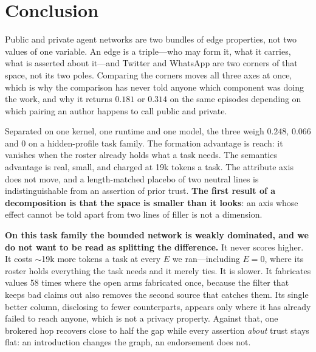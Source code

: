 \section{Conclusion}

Public and private agent networks are two bundles of edge properties, not two values of one
variable. An edge is a triple---who may form it, what it carries, what is asserted about
it---and Twitter and WhatsApp are two corners of that space, not its two poles. Comparing
the corners moves all three axes at once, which is why the comparison has never told anyone
which component was doing the work, and why it returns $0.181$ or $0.314$ on the same
episodes depending on which pairing an author happens to call public and private.

Separated on one kernel, one runtime and one model, the three weigh $0.248$, $0.066$ and $0$
on a hidden-profile task family. The formation advantage is reach: it vanishes when the
roster already holds what a task needs. The semantics advantage is real, small, and charged
at 19k tokens a task. The attribute axis does not move, and a length-matched placebo of two
neutral lines is indistinguishable from an assertion of prior trust. \textbf{The first
result of a decomposition is that the space is smaller than it looks}: an axis whose effect
cannot be told apart from two lines of filler is not a dimension.

\textbf{On this task family the bounded network is weakly dominated, and we do not want to
be read as splitting the difference.} It never scores higher. It costs $\sim$19k more tokens
a task at every $E$ we ran---including $E=0$, where its roster holds everything the task
needs and it merely ties. It is slower. It fabricates values 58 times where the open arms
fabricated once, because the filter that keeps bad claims out also removes the second source
that catches them. Its single better column, disclosing to fewer counterparts, appears only
where it has already failed to reach anyone, which is not a privacy property. Against that,
one brokered hop recovers close to half the gap while every assertion \emph{about} trust
stays flat: an introduction changes the graph, an endorsement does not.

